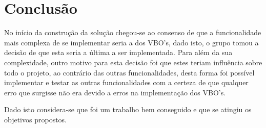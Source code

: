 \documentclass[11pt,a4paper]{report}
\begin{document}
\newpage


\newpage
\chapter{Conclusão}
No início da construção da solução chegou-se ao consenso de que a funcionalidade mais complexa de se implementar seria a dos VBO's, dado isto, o grupo tomou a decisão de que esta seria a última a ser implementada. Para além da sua complexidade, outro motivo para esta decisão foi que estes teriam influência sobre todo o projeto, ao contrário das outras funcionalidades, desta forma foi possível implementar e testar as outras funcionalidades com a certeza de que qualquer erro que surgisse não era devido a erros na implementação dos VBO's.

Dado isto considera-se que foi um trabalho bem conseguido e que se atingiu os objetivos propostos.
\end{document}
